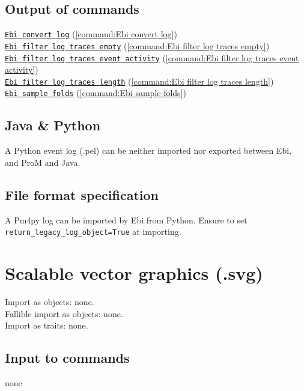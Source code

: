 {\subsection*{Output of commands} \null\qquad\hyperref[command:Ebi convert log]{\texttt{Ebi convert log}} (\cref{command:Ebi convert log})\\\null\qquad\hyperref[command:Ebi filter log traces empty]{\texttt{Ebi filter log traces empty}} (\cref{command:Ebi filter log traces empty})\\\null\qquad\hyperref[command:Ebi filter log traces event activity]{\texttt{Ebi filter log traces event activity}} (\cref{command:Ebi filter log traces event activity})\\\null\qquad\hyperref[command:Ebi filter log traces length]{\texttt{Ebi filter log traces length}} (\cref{command:Ebi filter log traces length})\\\null\qquad\hyperref[command:Ebi sample folds]{\texttt{Ebi sample folds}} (\cref{command:Ebi sample folds})
\subsection*{Java \& Python}
A Python event log (.pel) can be neither imported nor exported between Ebi, and ProM and Java.
\subsection*{File format specification}A Pm4py log can be imported by Ebi from Python. Ensure to set \texttt{return\_legacy\_log\_object=True} at importing.
\clearpage
\section{Scalable vector graphics (.svg)}
\label{filehandler:scalable vector graphics}
Import as objects: none.
\\Fallible import as objects: none.
\\Import as traits: none.
\subsection*{Input to commands} none
}
